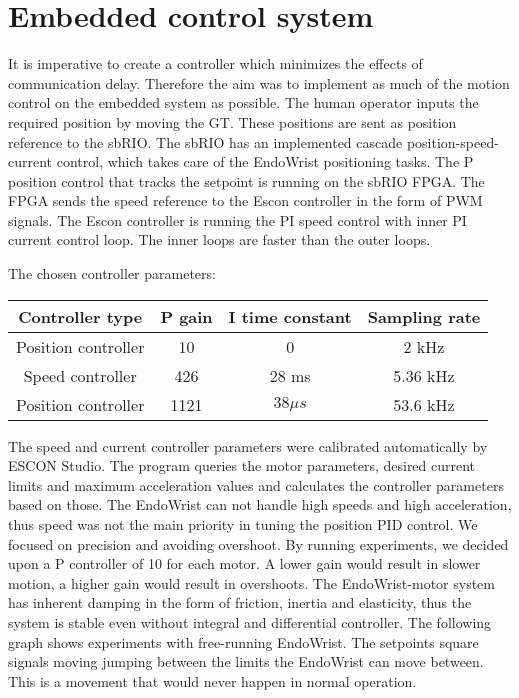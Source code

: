 \section{Embedded control system}

It is imperative to create a controller which minimizes the effects of communication delay. Therefore the aim was to implement as much of the motion control on the embedded system as possible. The human operator  inputs the required position by moving the GT. These positions are sent as position reference to the sbRIO. 
The sbRIO has an implemented cascade position-speed-current control, which takes care of the EndoWrist positioning tasks. The P position control that tracks the setpoint is running on the sbRIO FPGA. The FPGA sends the speed reference to the Escon controller in the form of PWM signals. The Escon controller is running the PI speed control with inner PI current control loop. The inner loops are faster than the outer loops.

The chosen controller parameters:

\begin{center}
	\begin{tabular}{ c | c | c | c }
		\hline
		Controller type & P gain & I time constant & Sampling rate \\ \hline
		Position controller & 10 & 0 & 2 kHz \\ \hline
		Speed controller & 426 & 28 ms & 5.36 kHz \\ \hline
		Position controller & 1121 & $38 \mu s$ & 53.6 kHz \\ \hline
	\end{tabular}
\end{center}

The speed and current controller parameters were calibrated automatically by ESCON Studio. The program queries the motor parameters, desired current limits and maximum acceleration values and calculates the controller parameters based on those. The EndoWrist can not handle high speeds and high acceleration, thus speed was not the main priority in tuning the position PID control. We focused on precision and avoiding overshoot. By running experiments, we decided upon a P controller of 10 for each motor. A lower gain would result in slower motion, a higher gain would result in overshoots. The EndoWrist-motor system has inherent damping in the form of friction, inertia and elasticity, thus the system is stable even without integral and differential controller. The following graph shows experiments with free-running EndoWrist. The setpoints square signals moving jumping between the limits the EndoWrist can move between. This is a movement that would never happen in normal operation.

